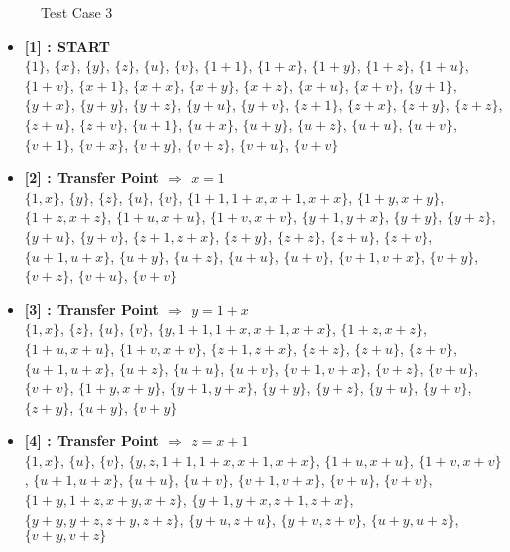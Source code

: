 \begin{figure}[H]
\label{fig:tc3}
    \caption{Test Case 3}
\end{figure}

\begin{itemize}

    \item \textbf{[1] : START}\\
        $\{1\}$, $\{x\}$, $\{y\}$, $\{z\}$, $\{u\}$, $\{v\}$, $\{1 + 1\}$, $\{1 + x\}$, $\{1 + y\}$, $\{1 + z\}$, $\{1 + u\}$, $\{1 + v\}$, $\{x + 1\}$, $\{x + x\}$, $\{x + y\}$, $\{x + z\}$, $\{x + u\}$, $\{x + v\}$, $\{y + 1\}$, $\{y + x\}$, $\{y + y\}$, $\{y + z\}$, $\{y + u\}$, $\{y + v\}$, $\{z + 1\}$, $\{z + x\}$, $\{z + y\}$, $\{z + z\}$, $\{z + u\}$, $\{z + v\}$, $\{u + 1\}$, $\{u + x\}$, $\{u + y\}$, $\{u + z\}$, $\{u + u\}$, $\{u + v\}$, $\{v + 1\}$, $\{v + x\}$, $\{v + y\}$, $\{v + z\}$, $\{v + u\}$, $\{v + v\}$

    \item \textbf{[2] : Transfer Point $\Rightarrow$ $x = 1$}\\
        $\{1, x\}$, $\{y\}$, $\{z\}$, $\{u\}$, $\{v\}$, $\{1 + 1, 1 + x, x + 1, x + x\}$, $\{1 + y, x + y\}$, $\{1 + z, x + z\}$, $\{1 + u, x + u\}$, $\{1 + v, x + v\}$, $\{y + 1, y + x\}$, $\{y + y\}$, $\{y + z\}$, $\{y + u\}$, $\{y + v\}$, $\{z + 1, z + x\}$, $\{z + y\}$, $\{z + z\}$, $\{z + u\}$, $\{z + v\}$, $\{u + 1, u + x\}$, $\{u + y\}$, $\{u + z\}$, $\{u + u\}$, $\{u + v\}$, $\{v + 1, v + x\}$, $\{v + y\}$, $\{v + z\}$, $\{v + u\}$, $\{v + v\}$

    \item \textbf{[3] : Transfer Point $\Rightarrow$ $y = 1 + x$}\\
        $\{1, x\}$, $\{z\}$, $\{u\}$, $\{v\}$, $\{y, 1 + 1, 1 + x, x + 1, x + x\}$, $\{1 + z, x + z\}$, $\{1 + u, x + u\}$, $\{1 + v, x + v\}$, $\{z + 1, z + x\}$, $\{z + z\}$, $\{z + u\}$, $\{z + v\}$, $\{u + 1, u + x\}$, $\{u + z\}$, $\{u + u\}$, $\{u + v\}$, $\{v + 1, v + x\}$, $\{v + z\}$, $\{v + u\}$, $\{v + v\}$, $\{1 + y, x + y\}$, $\{y + 1, y + x\}$, $\{y + y\}$, $\{y + z\}$, $\{y + u\}$, $\{y + v\}$, $\{z + y\}$, $\{u + y\}$, $\{v + y\}$

    \item \textbf{[4] : Transfer Point $\Rightarrow$ $z = x + 1$}\\
        $\{1, x\}$, $\{u\}$, $\{v\}$, $\{y, z, 1 + 1, 1 + x, x + 1, x + x\}$, $\{1 + u, x + u\}$, $\{1 + v, x + v\}$, $\{u + 1, u + x\}$, $\{u + u\}$, $\{u + v\}$, $\{v + 1, v + x\}$, $\{v + u\}$, $\{v + v\}$, $\{1 + y, 1 + z, x + y, x + z\}$, $\{y + 1, y + x, z + 1, z + x\}$, $\{y + y, y + z, z + y, z + z\}$, $\{y + u, z + u\}$, $\{y + v, z + v\}$, $\{u + y, u + z\}$, $\{v + y, v + z\}$


\end{itemize}
